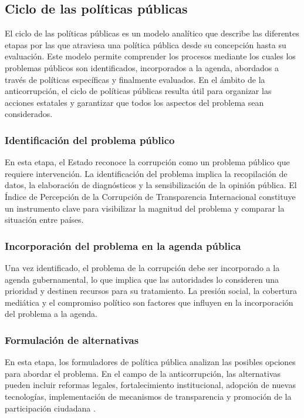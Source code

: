 \documentclass[12pt,a4paper]{article}
\begin{document}
\subsection{Ciclo de las políticas públicas}

El ciclo de las políticas públicas es un modelo analítico que describe las diferentes etapas por las que atraviesa una política pública desde su concepción hasta su evaluación. Este modelo permite comprender los procesos mediante los cuales los problemas públicos son identificados, incorporados a la agenda, abordados a través de políticas específicas y finalmente evaluados. En el ámbito de la anticorrupción, el ciclo de políticas públicas resulta útil para organizar las acciones estatales y garantizar que todos los aspectos del problema sean considerados.

\subsubsection{Identificación del problema público}

En esta etapa, el Estado reconoce la corrupción como un problema público que requiere intervención. La identificación del problema implica la recopilación de datos, la elaboración de diagnósticos y la sensibilización de la opinión pública. El Índice de Percepción de la Corrupción de Transparencia Internacional \parencite{transparencia2023} constituye un instrumento clave para visibilizar la magnitud del problema y comparar la situación entre países.

\subsubsection{Incorporación del problema en la agenda pública}

Una vez identificado, el problema de la corrupción debe ser incorporado a la agenda gubernamental, lo que implica que las autoridades lo consideren una prioridad y destinen recursos para su tratamiento. La presión social, la cobertura mediática y el compromiso político son factores que influyen en la incorporación del problema a la agenda.

\subsubsection{Formulación de alternativas}

En esta etapa, los formuladores de política pública analizan las posibles opciones para abordar el problema. En el campo de la anticorrupción, las alternativas pueden incluir reformas legales, fortalecimiento institucional, adopción de nuevas tecnologías, implementación de mecanismos de transparencia y promoción de la participación ciudadana \parencite{ocde2020}.
\end{document}
